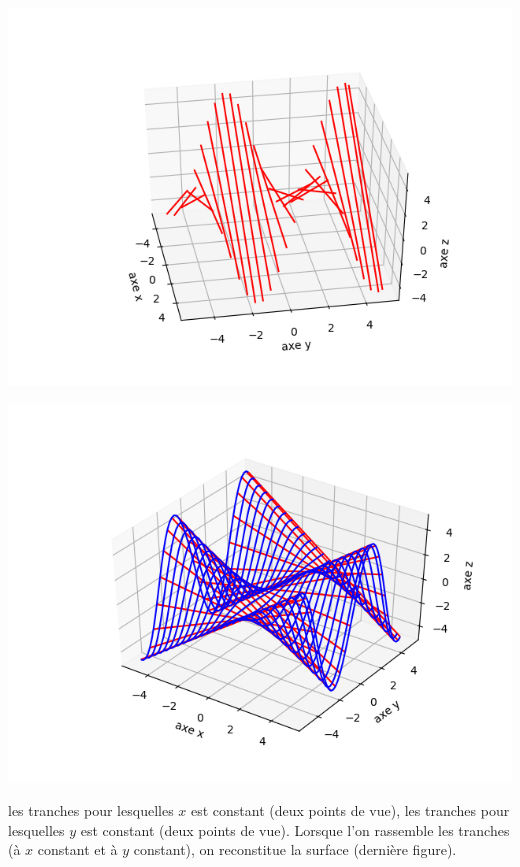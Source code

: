 \begin{exemple}{}{}
\begin{center}
		\includegraphics[scale=\myscale,scale=0.5]{figures/fonctions-surface-2d}
		
		\includegraphics[scale=\myscale,scale=0.7]{figures/fonctions-surface-2e}
	\end{center}
	
	 les tranches pour lesquelles $x$ est constant (deux points de vue),  les tranches pour lesquelles $y$ est constant (deux points de vue). Lorsque l'on rassemble les tranches (à $x$ constant et à $y$ constant), on reconstitue la surface (dernière figure). 
	
	
\end{exemple}


